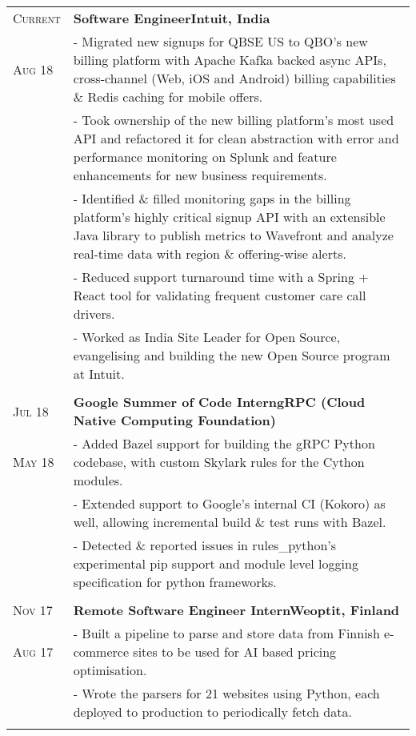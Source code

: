 \documentclass[a4paper,10pt]{extarticle} %
\begin{document}
\begin{tabularx}{\linewidth}{ l | X }

\textsc{Current} & \textbf{Software Engineer}\hfill\textbf{Intuit, India}\\
\textsc{Aug 18} & {- Migrated new signups for QBSE US to QBO's new billing platform with Apache Kafka backed async APIs, cross-channel (Web, iOS and Android) billing capabilities \& Redis caching for mobile offers.}\\
& {- Took ownership of the new billing platform's most used API and refactored it for clean abstraction with error and performance monitoring on Splunk and feature enhancements for new business requirements.}\\
& {- Identified \& filled monitoring gaps in the billing platform's highly critical signup API with an extensible Java library to publish metrics to Wavefront and analyze real-time data with region \& offering-wise alerts.}\\
& {- Reduced support turnaround time with a Spring + React tool for validating frequent customer care call drivers.}\\
& {- Worked as India Site Leader for Open Source, evangelising and building the new Open Source program at Intuit.}\\
\multicolumn{2}{c}{} \\

\textsc{Jul 18} & \textbf{Google Summer of Code Intern}\hfill\textbf{gRPC (Cloud Native Computing Foundation)}\\
\textsc{May 18}& {- Added Bazel support for building the gRPC Python codebase, with custom Skylark rules for the Cython modules.}\\
& {- Extended support to Google's internal CI (Kokoro) as well, allowing incremental build \& test runs with Bazel.}\\
& {- Detected \& reported issues in rules\_python's experimental pip support and module level logging specification for python frameworks.}\\
\multicolumn{2}{c}{} \\

\textsc{Nov 17} & \textbf{Remote Software Engineer Intern}\hfill\textbf{Weoptit, Finland}\\
\textsc{Aug 17}& {- Built a pipeline to parse and store data from Finnish e-commerce sites to be used for AI based pricing optimisation.}\\
& {- Wrote the parsers for 21 websites using Python, each deployed to production to periodically fetch data.}\\
\multicolumn{2}{c}{} \\


\end{tabularx}
\end{document}
